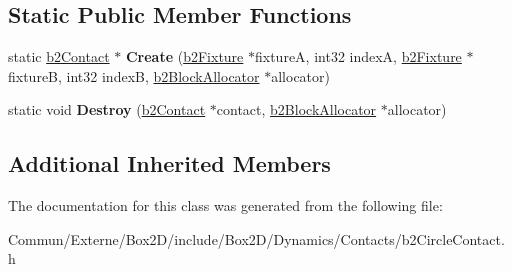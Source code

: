 \subsection*{Static Public Member Functions}
\begin{DoxyCompactItemize}
\item 
static \hyperlink{classb2_contact}{b2\+Contact} $\ast$ {\bfseries Create} (\hyperlink{classb2_fixture}{b2\+Fixture} $\ast$fixtureA, int32 indexA, \hyperlink{classb2_fixture}{b2\+Fixture} $\ast$fixtureB, int32 indexB, \hyperlink{classb2_block_allocator}{b2\+Block\+Allocator} $\ast$allocator)\hypertarget{classb2_circle_contact_a741c07fe3f626b80e01ff3d96cf2d90a}{}\label{classb2_circle_contact_a741c07fe3f626b80e01ff3d96cf2d90a}

\item 
static void {\bfseries Destroy} (\hyperlink{classb2_contact}{b2\+Contact} $\ast$contact, \hyperlink{classb2_block_allocator}{b2\+Block\+Allocator} $\ast$allocator)\hypertarget{classb2_circle_contact_a0171e991d568b7f4d8e5b4179072bf60}{}\label{classb2_circle_contact_a0171e991d568b7f4d8e5b4179072bf60}

\end{DoxyCompactItemize}
\subsection*{Additional Inherited Members}


The documentation for this class was generated from the following file\+:\begin{DoxyCompactItemize}
\item 
Commun/\+Externe/\+Box2\+D/include/\+Box2\+D/\+Dynamics/\+Contacts/b2\+Circle\+Contact.\+h\end{DoxyCompactItemize}
